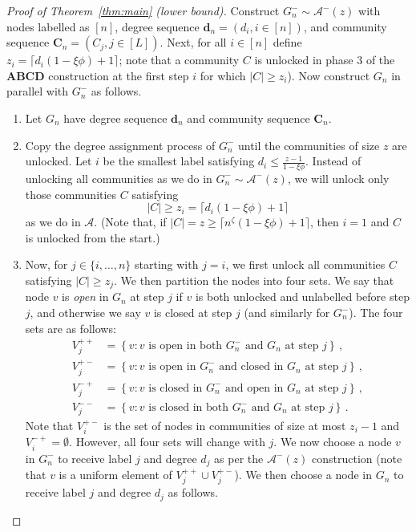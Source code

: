 \documentclass[12pt]{article}
\theoremstyle{definition}
\theoremstyle{remark}
\theoremstyle{remark}
\numberwithin{theorem}{section}
\newcommand{\abcdDist}{\ensuremath{\mathcal{A}}}
\newcommand{\abcdLower}{\ensuremath{\mathcal{A}^-(z)}}
\begin{document}
\begin{proof}[Proof of Theorem~\ref{thm:main} (lower bound)]
Construct $G_n^- \sim \abcdLower$ with nodes labelled as $[n]$, degree sequence $\textbf{d}_n = (d_i, i \in [n])$, and community sequence $\textbf{C}_n = (C_j,j \in [L])$. Next, for all $i \in [n]$ define $z_i = \lceil d_i(1-\xi \phi) + 1 \rceil$; note that a community $C$ is unlocked in phase 3 of the \textbf{ABCD} construction at the first step $i$ for which $|C| \geq z_i$). Now construct $G_n$ in parallel with $G_n^-$ as follows. 
\begin{enumerate}
\item Let $G_n$ have degree sequence $\textbf{d}_n$ and community sequence $\textbf{C}_n$. 
\item Copy the degree assignment process of $G_n^-$ until the communities of size $z$ are unlocked. Let $i$ be the smallest label satisfying $d_i \leq \frac{z-1}{1-\xi \phi}$. Instead of unlocking all communities as we do in $G_n^- \sim \abcdLower$, we will unlock only those communities $C$ satisfying 
$$
|C| \geq z_i = \lceil d_i(1-\xi \phi) + 1 \rceil
$$ 
as we do in $\abcdDist$. (Note that, if $|C| = z \geq \lceil n^\zeta(1-\xi \phi) + 1 \rceil$, then $i=1$ and $C$ is unlocked from the start.)
\item Now, for $j \in \{i,\dots ,n\}$ starting with $j = i$, we first unlock all communities $C$ satisfying $|C| \geq z_j$. We then partition the nodes into four sets. We say that node $v$ is \textit{open} in $G_n$ at step $j$ if $v$ is both unlocked and unlabelled before step $j$, and otherwise we say $v$ is closed at step $j$ (and similarly for $G_n^-$). The four sets are as follows:
\begin{align*}
V_j^{++} &= \left\{ v : v \text{ is open in both } G_n^- \text{ and } G_n \text{ at step } j \right\} \,, \\
V_j^{+-} &= \left\{ v : v \text{ is open in } G_n^- \text{ and closed in } G_n \text{ at step } j \right\} \,, \\
V_j^{-+} &= \left\{ v : v \text{ is closed in } G_n^- \text{ and open in } G_n \text{ at step } j \right\} \,, \\
V_j^{--} &= \left\{ v : v \text{ is closed in both } G_n^- \text{ and } G_n \text{ at step } j \right\} \,.
\end{align*}
Note that $V_i^{+-}$ is the set of nodes in communities of size at most $z_i-1$ and $V_i^{-+} = \emptyset$. However, all four sets will change with $j$. We now choose a node $v$ in $G_n^-$ to receive label $j$ and degree $d_j$ as per the $\abcdLower$ construction (note that $v$ is a uniform element of $V_j^{++} \cup V_j^{+-}$). We then choose a node in $G_n$ to receive label $j$ and degree $d_j$ as follows.

\end{enumerate}
\end{proof}
\end{document}
